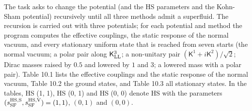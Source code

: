 \documentclass[
  10pt,
]{article}
\begin{document}
The task asks to change the potential (and the HS parameters and the
Kohn-Sham potential) recursively until all three methods admit a
superfluid. The recursion is carried out with three potentials; for each
potential and method the program computes the effective couplings, the
static response of the normal vacuum, and every stationary uniform state
that is reached from seven starts (the normal vacuum; a polar pair along
\(\mathsf K^3_{\rm LL}\); a non-unitary pair
\((\mathsf K^1+i\mathsf K^2)/\sqrt2\); Dirac masses raised by \(0.5\)
and lowered by \(1\) and \(3\); a lowered mass with a polar pair). Table
10.1 lists the effective couplings and the static response of the normal
vacuum, Table 10.2 the ground states, and Table 10.3 all stationary
states. In the tables, HS (1, 1), HS (0, 1) and HS (0, 0) denote HS with
the parameters \((s^{\rm HS,S}_{\rm SF},s^{\rm HS,V}_{\rm SF})=(1,1)\),
\((0,1)\) and \((0,0)\).
\end{document}
